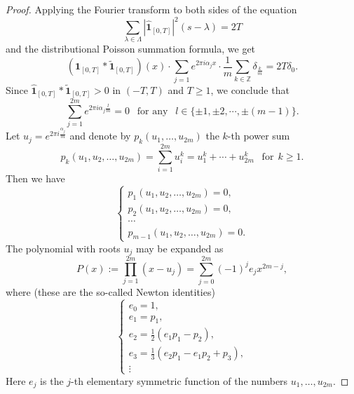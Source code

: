 \documentclass[10pt,a4paper]{amsart}
\begin{document}
\begin{proof}
 Applying the Fourier transform to both sides of the equation 
 $$\sum_{\lambda  \in \Lambda }\left|\hat{ \mathbf{1}}_{\left[0, T \right]}\right|^2\left(s-\lambda\right) = 2T$$
 and the distributional Poisson summation formula, we get
$$
( { \mathbf{1}}_{\left[0, T\right]}* \widetilde{ \mathbf{1}}_{\left[0, T\right]})(x) \cdot \sum_{j=1} e^{2 \pi i \alpha_j x}\cdot \frac{1}{m} \sum_{k \in \mathbb{Z}} \delta_{\frac{k}{m}}=2 T \delta_0.
$$
Since  $\hat{ \mathbf{1}}_{\left[0, T\right]}* \tilde{ \mathbf{1}}_{\left[0, T\right]} > 0$ in $(-T, T)$ and $T\geq 1$, we conclude that
$$
\sum_{j=1}^{2m} e^{2 \pi i \alpha_j\frac{l}{m}}=0\ \ \text{ for any }\ \ l\in\{ \pm 1,  \pm2, \cdots,  \pm  (m-1)\}.
$$  
Let $u_j=e^{2 \pi i \frac{\alpha_j}{m}}$ and  
 denote    by  $p_k\left(u_1, \ldots, u_{2m}\right)$   the $k$-th power sum
$$
p_k\left(u_1, u_2, \ldots, u_{2m}\right)=\sum_{i=1}^{2m} u_i^k=u_1^k+\cdots+u_{2m}^k 
\ \   \text{ for} \ \  k \geqslant 1.
$$
Then we have 
\begin{equation}\label{eq(0.002)}
\begin{cases}
p_1\left(u_1, u_2, \ldots, u_{2m}\right)=0,\\[6pt]
p_2\left(u_1, u_2, \ldots, u_{2m}\right)=0,\\[6pt]
  \cdots  \\%
 p_{m-1}\left(u_1, u_2, \ldots, u_{2m}\right)=0. 
 \end{cases}
\end{equation}
The polynomial with roots $u_j$  may be expanded as
$$
P(x):=\prod_{j=1}^{2m}\left(x-u_j\right)=\sum_{j=0}^{2m}(-1)^j e_j x^{2m-j},
$$
where (these are the so-called Newton identities)
\begin{equation*}
\begin{cases} 
e_0 =1, \\[6pt]
e_1 =p_1, \\[6pt]
e_2 =\frac{1}{2}\left(e_1 p_1-p_2\right),\\[6pt]
e_3 =\frac{1}{3}\left(e_2 p_1-e_1 p_2+p_3\right),\\%
 \vdots
\end{cases}
\end{equation*}
Here $e_j$ is the $j$-th elementary symmetric function of the numbers $u_1, \ldots, u_{2m}$.


\end{proof}
\end{document}
